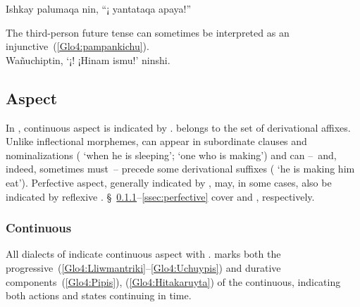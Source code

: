 %
{Ishkay palumaqa nin, “¡ yantataqa apaya!”}%
{}%
{}{}%

\noindent
The third-person future tense can sometimes be interpreted as an injunctive~(\ref{Glo4:pampankichu}).\\

%
{Wañuchiptin, ‘¡! ¡Hinam ismu!’ ninshi.}%
{}%
{}{}%

\subsection{Aspect}\label{ssec:aspect}
In \SYQ, continuous aspect is indicated by .  belongs to the set of derivational affixes. Unlike inflectional morphemes,  can appear in subordinate clauses and nominalizations ( ‘when he is sleeping’;  ‘one who is making’) and can --~and, indeed, sometimes must~-- precede some derivational suffixes ( ‘he is making him eat’). Perfective aspect, generally indicated by , may, in some cases, also be indicated by reflexive . §~\ref{ssec:progressive}--\ref{ssec:perfective} cover  and , respectively.

\subsubsection{Continuous }\label{ssec:progressive}
All dialects of \SYQ{} indicate continuous aspect with .  marks both the progressive~(\ref{Glo4:Lliwmantriki}--\ref{Glo4:Uchuypis}) and durative components~(\ref{Glo4:Pipis}), (\ref{Glo4:Hitakaruyta}) of the continuous, indicating both actions and states continuing in time.\\

